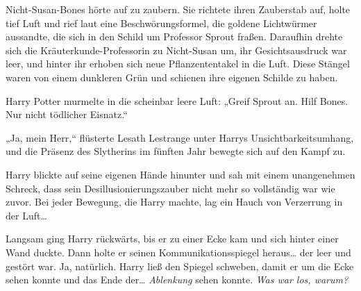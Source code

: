 Nicht-Susan-Bones hörte auf zu zaubern. Sie richtete ihren Zauberstab auf, holte tief Luft und rief laut eine Beschwörungsformel, die goldene Lichtwürmer aussandte, die sich in den Schild um Professor Sprout fraßen. Daraufhin drehte sich die Kräuterkunde-Professorin zu Nicht-Susan um, ihr Gesichtsausdruck war leer, und hinter ihr erhoben sich neue Pflanzententakel in die Luft. Diese Stängel waren von einem dunkleren Grün und schienen ihre eigenen Schilde zu haben.

Harry Potter murmelte in die scheinbar leere Luft: „Greif Sprout an. Hilf Bones. Nur nicht tödlicher Eisnatz.“

„Ja, mein Herr,“ flüsterte Lesath Lestrange unter Harrys Unsichtbarkeitsumhang, und die Präsenz des Slytherins im fünften Jahr bewegte sich auf den Kampf zu.

Harry blickte auf seine eigenen Hände hinunter und sah mit einem unangenehmen Schreck, dass sein Desillusionierungszauber nicht mehr so vollständig war wie zuvor.
Bei jeder Bewegung, die Harry machte, lag ein Hauch von Verzerrung in der Luft…

Langsam ging Harry rückwärts, bis er zu einer Ecke kam und sich hinter einer Wand duckte. Dann holte er seinen Kommunikationsspiegel heraus… der leer und gestört war. Ja, natürlich. Harry ließ den Spiegel schweben, damit er um die Ecke sehen konnte und das Ende der… \emph{Ablenkung} sehen konnte.
\emph{Was war los, warum?}

